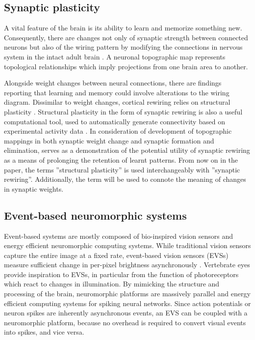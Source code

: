 \documentclass[letterpaper, 10 pt, conference]{ieeeconf}  %
\begin{document}
\subsection{Synaptic plasticity}

A vital feature of the brain is its ability to learn and memorize something new. Consequently, there are changes not only of synaptic strength between connected neurons but also of the wiring pattern by modifying the connections  in nervous system in the intact adult brain \cite{albieri2015rapid}.
A neuronal topographic map represents topological relationships which imply projections from one brain area to another.

Alongside weight changes between neural connections, there are findings reporting that learning and memory  could involve alterations to the wiring diagram.
Dissimilar to weight changes, cortical rewiring relies on structural plasticity \cite{Chklovskii2004b}.
Structural plasticity in the form of synaptic rewiring is also a useful computational tool, used to automatically generate connectivity based on experimental activity data \cite{Diaz-Pier2016a}.
In consideration of development of topographic mappings in both synaptic weight change and synaptic formation and elimination, \cite{bamford2010synaptic} serves as a demonstration of the potential utility of synaptic rewiring as a means of prolonging the retention of learnt patterns.
From now on in the paper, the terms ''structural plasticity'' is used interchangeably with ''synaptic rewiring''.
Additionally, the term will be used to connote the meaning of changes in synaptic weights.

\subsection{Event-based neuromorphic systems}

Event-based systems are mostly composed of bio-inspired vision sensors and energy efficient neuromorphic computing systems. 
While traditional vision sensors capture the entire image at a fixed rate, event-based vision sensors (EVSs) measure sufficient change in per-pixel brightness asynchronously \cite{Gallego2019}.
Vertebrate eyes provide inspiration to EVSs, in particular from the function of photoreceptors which react to changes in illumination.
By mimicking the structure and processing of the brain, neuromorphic platforms are massively parallel and energy efficient computing systems for spiking neural networks.
Since action potentials or neuron spikes are inherently asynchronous events, an EVS can be coupled with a neuromorphic platform, because no overhead is required to convert visual events into spikes, and vice versa.
\end{document}

